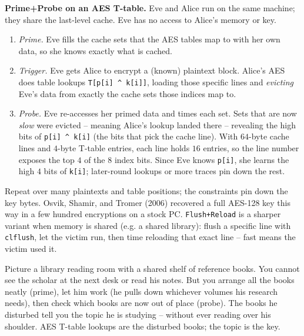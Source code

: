 \begin{attackbox}
\textbf{Prime+Probe on an AES T-table.} Eve and Alice run on the same machine; they share the last-level cache. Eve has no access to Alice's memory or key.
\begin{enumerate}
\item \emph{Prime.} Eve fills the cache sets that the AES tables map to with her own data, so she knows exactly what is cached.
\item \emph{Trigger.} Eve gets Alice to encrypt a (known) plaintext block. Alice's AES does table lookups \texttt{T[p[i] \^{} k[i]]}, loading those specific lines and \emph{evicting} Eve's data from exactly the cache sets those indices map to.
\item \emph{Probe.} Eve re-accesses her primed data and times each set. Sets that are now \emph{slow} were evicted -- meaning Alice's lookup landed there -- revealing the high bits of \texttt{p[i] \^{} k[i]} (the bits that pick the cache line). With $64$-byte cache lines and $4$-byte T-table entries, each line holds $16$ entries, so the line number exposes the top $4$ of the $8$ index bits. Since Eve knows \texttt{p[i]}, she learns the high $4$ bits of \texttt{k[i]}; later-round lookups or more traces pin down the rest.
\end{enumerate}
Repeat over many plaintexts and table positions; the constraints pin down the key bytes. Osvik, Shamir, and Tromer (2006) recovered a full AES-128 key this way in a few hundred encryptions on a stock PC. \texttt{Flush+Reload} is a sharper variant when memory is shared (e.g. a shared library): flush a specific line with \texttt{clflush}, let the victim run, then time reloading that exact line -- fast means the victim used it.
\end{attackbox}

\begin{intuitionbox}
Picture a library reading room with a shared shelf of reference books. You cannot see the scholar at the next desk or read his notes. But you arrange all the books neatly (prime), let him work (he pulls down whichever volumes his research needs), then check which books are now out of place (probe). The books he disturbed tell you the topic he is studying -- without ever reading over his shoulder. AES T-table lookups are the disturbed books; the topic is the key.
\end{intuitionbox}

